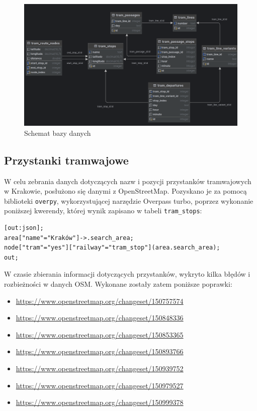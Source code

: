 \documentclass[12pt,a4paper]{article}
\begin{document}
        \begin{figure}[H]
            \centering
            \includegraphics[width=\textwidth]{database-diagram.png}
            \caption{Schemat bazy danych}
        \end{figure}

        \subsection{Przystanki tramwajowe}
            W celu zebrania danych dotyczących nazw i pozycji przystanków tramwajowych w Krakowie, posłużono się danymi z OpenStreetMap. Pozyskano je za pomocą biblioteki \texttt{overpy}\cite{overpy}, wykorzystującej narzędzie Overpass turbo, poprzez wykonanie poniższej kwerendy, której wynik zapisano w tabeli \texttt{tram\_stops}:

\begin{verbatim}
[out:json];
area["name"="Kraków"]->.search_area;
node["tram"="yes"]["railway"="tram_stop"](area.search_area);
out;
\end{verbatim}

            W czasie zbierania informacji dotyczących przystanków, wykryto kilka błędów i rozbieżności w danych OSM. Wykonane zostały zatem poniższe poprawki:
            \begin{itemize}
                \item \url{https://www.openstreetmap.org/changeset/150757574}
                \item \url{https://www.openstreetmap.org/changeset/150848336}
                \item \url{https://www.openstreetmap.org/changeset/150853365}
                \item \url{https://www.openstreetmap.org/changeset/150893766}
                \item \url{https://www.openstreetmap.org/changeset/150939752}
                \item \url{https://www.openstreetmap.org/changeset/150979527}
                \item \url{https://www.openstreetmap.org/changeset/150999378}
            \end{itemize}
\end{document}

